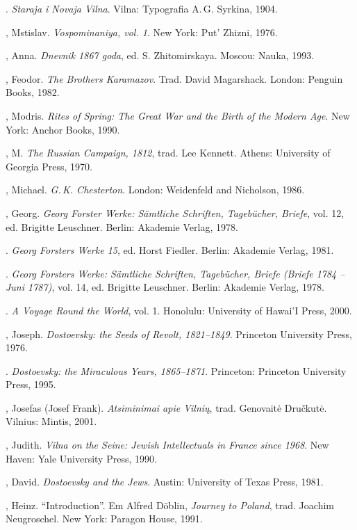 \begin{bibliohedra}
  \titidem. \emph{Staraja i Novaja Vilna}. Vilna: Typografia A.\,G.
  Syrkina, 1904.

  , Mstislav. \emph{Vospominaniya, vol. 1}. New York: Put'
  Zhizni, 1976.

  , Anna. \emph{Dnevnik 1867 goda}, ed. S. Zhitomirskaya.
  Moscou: Nauka, 1993.

  , Feodor. \emph{The Brothers Karamazov}. Trad. David
  Magarshack. London: Penguin Books, 1982.

  , Modris. \emph{Rites of Spring: The Great War and the Birth
  of the Modern Age}. New York: Anchor Books, 1990.

  , M. \emph{The Russian Campaign, 1812}, trad. Lee Kennett.
  Athens: University of Georgia Press, 1970.

  , Michael. \emph{G.\,K. Chesterton}. London: Weidenfeld and
  Nicholson, 1986.

  , Georg. \emph{Georg Forster Werke: Sämtliche Schriften,
  Tagebücher, Briefe}, vol. 12, ed. Brigitte Leuschner. Berlin: Akademie
  Verlag, 1978.

  \titidem. \emph{Georg Forsters Werke 15}, ed. Horst Fiedler.
  Berlin: Akademie Verlag, 1981.

  \titidem. \emph{Georg Forsters Werke: Sämtliche Schriften,
  Tagebücher, Briefe (Briefe 1784 -- Juni 1787)}, vol. 14, ed. Brigitte
  Leuschner. Berlin: Akademie Verlag, 1978.

  \titidem. \emph{A Voyage Round the World}, vol. 1. Honolulu:
  University of Hawai'I Press, 2000.

  , Joseph. \emph{Dostoevsky: the Seeds of Revolt, 1821--1849}.
  Princeton University Press, 1976.

  \titidem. \emph{Dostoevsky: the Miraculous Years, 1865--1871}.
  Princeton: Princeton University Press, 1995.

  , Josefas (Josef Frank). \emph{Atsiminimai apie Vilnių}, trad.
  Genovaitė Dručkutė. Vilnius: Mintis, 2001.

  , Judith. \emph{Vilna on the Seine: Jewish Intellectuals in
  France since 1968}. New Haven: Yale University Press, 1990.

  , David. \emph{Dostoevsky and the Jews}. Austin: University
  of Texas Press, 1981.

  , Heinz. ``Introduction''. Em Alfred Döblin, \emph{Journey to
  Poland}, trad. Joachim Neugroschel. New York: Paragon House, 1991.


\end{bibliohedra}
